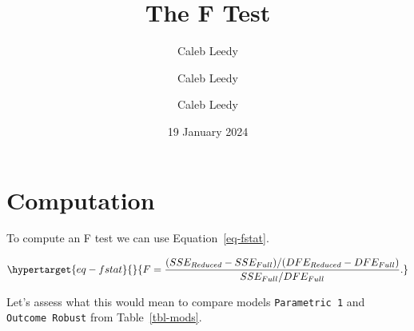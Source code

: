 \documentclass[
  12pt]{simple-article}%
\title{The F Test}
\author{Caleb Leedy}
\author{Caleb Leedy}
\author[]{Caleb Leedy}
\date{19 January 2024}
\begin{document}
\maketitle

\ifdefined\Shaded\renewenvironment{Shaded}{\begin{tcolorbox}[boxrule=0pt, breakable, frame hidden, interior hidden, sharp corners, borderline west={3pt}{0pt}{shadecolor}, enhanced]}{\end{tcolorbox}}\fi




\hypertarget{computation}{%
\section{Computation}\label{computation}}

To compute an F test we can use Equation~\ref{eq-fstat}.

\begin{equation}\protect\hypertarget{eq-fstat}{}{ F = \frac{(SSE_{Reduced} - SSE_{Full}) / (DFE_{Reduced} - DFE_{Full})}{
SSE_{Full} / DFE_{Full}}. }\label{eq-fstat}\end{equation}

Let's assess what this would mean to compare models
\texttt{Parametric\ 1} and \texttt{Outcome\ Robust} from
Table~\ref{tbl-mods}.
\end{document}
